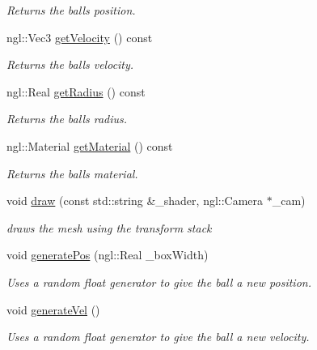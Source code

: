\begin{DoxyCompactItemize}
\begin{DoxyCompactList}\small\item\em Returns the ball\textquotesingle{}s position. \end{DoxyCompactList}\item 
\hypertarget{class_ball_acea6bc58341f19b42fa3036e07f3e363}{}ngl\+::\+Vec3 \hyperlink{class_ball_acea6bc58341f19b42fa3036e07f3e363}{get\+Velocity} () const \label{class_ball_acea6bc58341f19b42fa3036e07f3e363}

\begin{DoxyCompactList}\small\item\em Returns the ball\textquotesingle{}s velocity. \end{DoxyCompactList}\item 
\hypertarget{class_ball_a27052308f4e776f2c626da88e1b5e840}{}ngl\+::\+Real \hyperlink{class_ball_a27052308f4e776f2c626da88e1b5e840}{get\+Radius} () const \label{class_ball_a27052308f4e776f2c626da88e1b5e840}

\begin{DoxyCompactList}\small\item\em Returns the ball\textquotesingle{}s radius. \end{DoxyCompactList}\item 
\hypertarget{class_ball_a97d273f777a59e0be7ffbf4bef209454}{}ngl\+::\+Material \hyperlink{class_ball_a97d273f777a59e0be7ffbf4bef209454}{get\+Material} () const \label{class_ball_a97d273f777a59e0be7ffbf4bef209454}

\begin{DoxyCompactList}\small\item\em Returns the ball\textquotesingle{}s material. \end{DoxyCompactList}\item 
void \hyperlink{class_ball_a2b9b447d1971e8de179e5e266e37114b}{draw} (const std\+::string \&\+\_\+shader, ngl\+::\+Camera $\ast$\+\_\+cam)
\begin{DoxyCompactList}\small\item\em draws the mesh using the transform stack \end{DoxyCompactList}\item 
void \hyperlink{class_ball_a326e028f9889e8d7900c9d4d0d9f617e}{generate\+Pos} (ngl\+::\+Real \+\_\+box\+Width)
\begin{DoxyCompactList}\small\item\em Uses a random float generator to give the ball a new position. \end{DoxyCompactList}\item 
\hypertarget{class_ball_aca5fc0e9ccbbad1689834d6c364d24b0}{}void \hyperlink{class_ball_aca5fc0e9ccbbad1689834d6c364d24b0}{generate\+Vel} ()\label{class_ball_aca5fc0e9ccbbad1689834d6c364d24b0}

\begin{DoxyCompactList}\small\item\em Uses a random float generator to give the ball a new velocity. \end{DoxyCompactList}\end{DoxyCompactItemize}


